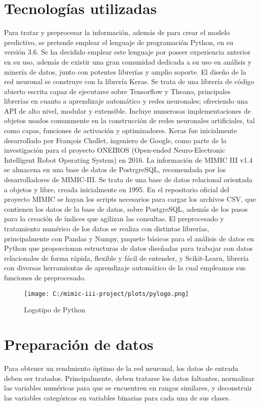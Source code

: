 \documentclass{report}
\begin{document}
\section{Tecnologías utilizadas}

Para tratar y preprocesar la información, además de para crear el modelo predictivo, se pretende emplear el lenguaje de programación Python, en su versión 3.6. Se ha decidido emplear este lenguaje por poseer experiencia anterior en su uso, además de existir una gran comunidad dedicada a su uso en análisis y minería de datos, junto con potentes librerías y amplio soporte. 
El diseño de la red neuronal se construye con la librería Keras. Se trata de una librería de código abierto escrita capaz de ejecutarse sobre Tensorflow y Theano, principales librerías en cuanto a aprendizaje automático y redes neuronales; ofreciendo una API de alto nivel, modular y extensible. Incluye numerosas implementaciones de objetos usados comunmente en la construcción de redes neuronales artificiales, tal como capas, funciones de activación y optimizadores. Keras fue inicialmente desarrollado por François Chollet, ingeniero de Google, como parte de la investigación para el proyecto ONEIROS (Open-ended Neuro-Electronic Intelligent Robot Operating System) en 2016.
La información de MIMIC III v1.4 se almacena en una base de datos de PostrgreSQL, recomendada por los desarrolladores de MIMIC-III. Se trata de una base de datos relacional orientada a objetos y libre, creada inicialmente en 1995. En el repositorio oficial del proyecto MIMIC se hayan los scripts necesarios para cargar los archivos CSV, que contienen los datos de la base de datos, sobre PostgreSQL, además de los pasos para la creación de índices que agilizan las consultas. 
El preprocesado y tratamiento numérico de los datos se realiza con distintas librerías, principalmente con Pandas y Numpy,  paquete básicos para el análisis de datos en Python que proporcionan estructuras de datos diseñadas para trabajar con datos relacionales de forma rápida, flexible y fácil de entender, y Scikit-Learn, librería con diversas herramientas de aprendizaje automático de la cual empleamos sus funciones de preprocesado.


\begin{figure}[h]
\centering
\texttt{[image: C:/mimic-iii-project/plots/pylogo.png]}
\caption{Logotipo de Python}
\end{figure}
\section{Preparación de datos}
Para obtener un rendmiento óptimo de la red neuronal, los datos de entrada deben ser tratados. Principalmente, deben tratarse los datos faltantes, normalizar las variables numéricas para que se encuentren en rangos similares, y deconstruir las variables categóricas en variables binarias para cada una de sus clases. 
\end{document}
